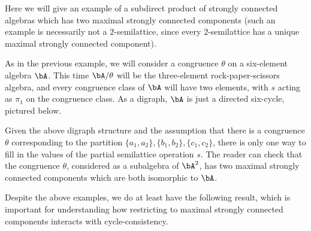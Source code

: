 \begin{ex} Here we will give an example of a subdirect product of strongly connected algebras which has two maximal strongly connected components (such an example is necessarily not a $2$-semilattice, since every $2$-semilattice has a unique maximal strongly connected component).

As in the previous example, we will consider a congruence $\theta$ on a six-element algebra $\bA$. This time $\bA/\theta$ will be the three-element rock-paper-scissors algebra, and every congruence class of $\bA$ will have two elements, with $s$ acting as $\pi_1$ on the congruence class. As a digraph, $\bA$ is just a directed six-cycle, pictured below.
\begin{center}
\end{center}
Given the above digraph structure and the assumption that there is a congruence $\theta$ corresponding to the partition $\{a_1,a_2\},\{b_1,b_2\},\{c_1,c_2\}$, there is only one way to fill in the values of the partial semilattice operation $s$. The reader can check that the congruence $\theta$, considered as a subalgebra of $\bA^2$, has two maximal strongly connected components which are both isomorphic to $\bA$.
\end{ex}

Despite the above examples, we do at least have the following result, which is important for understanding how restricting to maximal strongly connected components interacts with cycle-consistency.

